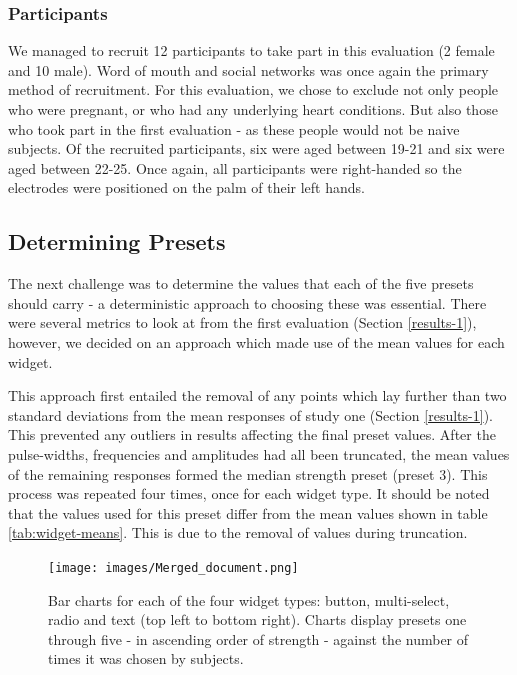 \documentclass{mpaper}
\begin{document}
\subsubsection{Participants}\label{subsec:participants-2}
We managed to recruit 12 participants to take part in this evaluation (2 female and 10 male). Word of mouth and social networks was once again the primary method of recruitment. For this evaluation, we chose to exclude not only people who were pregnant, or who had any underlying heart conditions. But also those who took part in the first evaluation - as these people would not be naive subjects. Of the recruited participants, six were aged between 19-21 and six were aged between 22-25. Once again, all participants were right-handed so the electrodes were positioned on the palm of their left hands.

\subsection{Determining Presets}

The next challenge was to determine the values that each of the five presets should carry - a deterministic approach to choosing these was essential. There were several metrics to look at from the first evaluation (Section \ref{results-1}), however, we decided on an approach which made use of the mean values for each widget. 

This approach first entailed the removal of any points which lay further than two standard deviations from the mean responses of study one (Section \ref{results-1}). This prevented any outliers in results affecting the final preset values. After the pulse-widths, frequencies and amplitudes had all been truncated, the mean values of the remaining responses formed the median strength preset (preset 3). This process was repeated four times, once for each widget type. It should be noted that the values used for this preset differ from the mean values shown in table \ref{tab:widget-means}. This is due to the removal of values during truncation.


\begin{figure}
    \centering
    \texttt{[image: images/Merged\_document.png]}
    \caption{Bar charts for each of the four widget types: button, multi-select, radio and text (top left to bottom right). Charts display presets one through five - in ascending order of strength - against the number of times it was chosen by subjects. }
    \label{fig:preset-results}
\end{figure}
\end{document}
